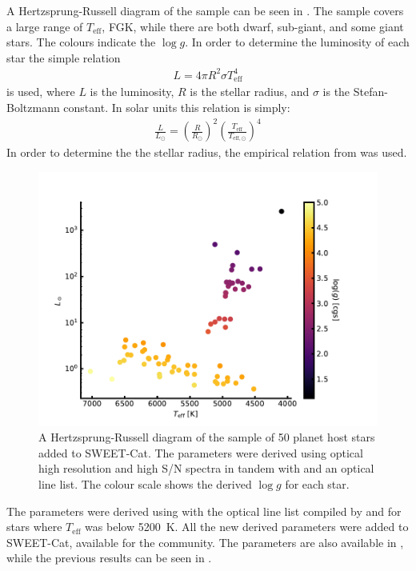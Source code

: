 A Hertzsprung-Russell diagram of the sample can be seen in . The sample covers a
large range of $T_\mathrm{eff}$, FGK, while there are both dwarf, sub-giant, and some giant stars.
The colours indicate the $\log g$. In order to determine the luminosity of each star the simple
relation
\begin{align*}
  L = 4\pi R^2 \sigma T^4_\mathrm{eff}
\end{align*}
is used, where $L$ is the luminosity, $R$ is the stellar radius, and $\sigma$ is the
Stefan-Boltzmann constant. In solar units this relation is simply:
\begin{align*}
  \frac{L}{L_\odot} = \left(\frac{R}{R_\odot}\right)^2 \left(\frac{T_\mathrm{eff}}{T_{\mathrm{eff},\odot}}\right)^4
\end{align*}
In order to determine the the stellar radius, the empirical relation from \citet{Torres2010} was
used.

\begin{figure}[htpb!]
    \centering
    \includegraphics[width=1.0\linewidth]{figures/HR.pdf}
    \caption{A Hertzsprung-Russell diagram of the sample of 50 planet host stars added to SWEET-Cat.
             The parameters were derived using optical high resolution and high S/N spectra in
             tandem with  and an optical line list. The colour scale shows the derived
             $\log g$ for each star.}
    \label{fig:sweetcat}
\end{figure}

The parameters were derived using  with the optical line list compiled by
\citet{Sousa2008a} and \citet{Tsantaki2013} for stars where $T_\mathrm{eff}$ was below \SI{5200}{K}.
All the new derived parameters were added to SWEET-Cat, available for the community. The parameters
are also available in , while the previous results can be seen in
.

